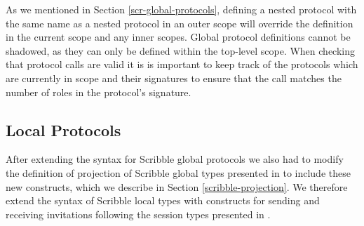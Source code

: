 \documentclass[12pt,twoside]{report}
\begin{document}
As we mentioned in Section \ref{scr-global-protocols}, defining a nested protocol with the same name as a nested protocol in an outer scope will override the definition in the current scope and any inner scopes. Global protocol definitions cannot be shadowed, as they can only be defined within the top-level scope. When checking that protocol calls are valid it is is important to keep track of the protocols which are currently in scope and their signatures to ensure that the call matches the number of roles in the protocol's signature. 

\subsection{Local Protocols}

After extending the syntax for Scribble global protocols we also had to modify the definition of projection of Scribble global types presented in \cite{featherweight} to include these new constructs, which we describe in Section \ref{scribble-projection}. We therefore extend the syntax of Scribble local types with constructs for sending and receiving invitations following the session types presented in \cite{nestedprotocols}. \\

        
    
    
        
        
        
        
    
    
\end{document}
